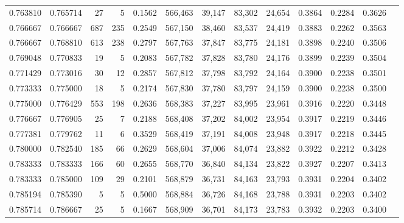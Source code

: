 \begin{tabular}{rrrrrrrrrrrrr}
0.763810 & 0.765714 &     27 &      5 &                                     0.1562 & 566,463 &  39,147 &  83,302 &  24,654 & 0.3864 & 0.2284 & 0.3626 \\
0.766667 & 0.766667 &    687 &    235 &                                     0.2549 & 567,150 &  38,460 &  83,537 &  24,419 & 0.3883 & 0.2262 & 0.3563 \\
0.766667 & 0.768810 &    613 &    238 &                                     0.2797 & 567,763 &  37,847 &  83,775 &  24,181 & 0.3898 & 0.2240 & 0.3506 \\
0.769048 & 0.770833 &     19 &      5 &                                     0.2083 & 567,782 &  37,828 &  83,780 &  24,176 & 0.3899 & 0.2239 & 0.3504 \\
0.771429 & 0.773016 &     30 &     12 &                                     0.2857 & 567,812 &  37,798 &  83,792 &  24,164 & 0.3900 & 0.2238 & 0.3501 \\
0.773333 & 0.775000 &     18 &      5 &                                     0.2174 & 567,830 &  37,780 &  83,797 &  24,159 & 0.3900 & 0.2238 & 0.3500 \\
0.775000 & 0.776429 &    553 &    198 &                                     0.2636 & 568,383 &  37,227 &  83,995 &  23,961 & 0.3916 & 0.2220 & 0.3448 \\
0.776667 & 0.776905 &     25 &      7 &                                     0.2188 & 568,408 &  37,202 &  84,002 &  23,954 & 0.3917 & 0.2219 & 0.3446 \\
0.777381 & 0.779762 &     11 &      6 &                                     0.3529 & 568,419 &  37,191 &  84,008 &  23,948 & 0.3917 & 0.2218 & 0.3445 \\
0.780000 & 0.782540 &    185 &     66 &                                     0.2629 & 568,604 &  37,006 &  84,074 &  23,882 & 0.3922 & 0.2212 & 0.3428 \\
0.783333 & 0.783333 &    166 &     60 &                                     0.2655 & 568,770 &  36,840 &  84,134 &  23,822 & 0.3927 & 0.2207 & 0.3413 \\
0.783333 & 0.785000 &    109 &     29 &                                     0.2101 & 568,879 &  36,731 &  84,163 &  23,793 & 0.3931 & 0.2204 & 0.3402 \\
0.785194 & 0.785390 &      5 &      5 &                                     0.5000 & 568,884 &  36,726 &  84,168 &  23,788 & 0.3931 & 0.2203 & 0.3402 \\
0.785714 & 0.786667 &     25 &      5 &                                     0.1667 & 568,909 &  36,701 &  84,173 &  23,783 & 0.3932 & 0.2203 & 0.3400 \\

\end{tabular}
